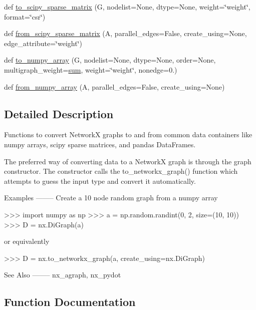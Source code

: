 \begin{DoxyCompactItemize}
def \hyperlink{namespacenetworkx_1_1convert__matrix_a47cedef23442ab34bf69fffb4119a442}{to\+\_\+scipy\+\_\+sparse\+\_\+matrix} (G, nodelist=None, dtype=None, weight=\char`\"{}weight\char`\"{}, format=\char`\"{}csr\char`\"{})
\item 
def \hyperlink{namespacenetworkx_1_1convert__matrix_ac8fbd2e587cd297b41557ad1299a9e7d}{from\+\_\+scipy\+\_\+sparse\+\_\+matrix} (A, parallel\+\_\+edges=False, create\+\_\+using=None, edge\+\_\+attribute=\char`\"{}weight\char`\"{})
\item 
def \hyperlink{namespacenetworkx_1_1convert__matrix_acff6b353b4693143c1fad4d2c1c7a335}{to\+\_\+numpy\+\_\+array} (G, nodelist=None, dtype=None, order=None, multigraph\+\_\+weight=\hyperlink{assumed__shape_2foo__free_8f90_a1c860bb40bf43c289bc16f8634733f9a}{sum}, weight=\char`\"{}weight\char`\"{}, nonedge=0.)
\item 
def \hyperlink{namespacenetworkx_1_1convert__matrix_abb1bfd74c48ba52319e8ccbaa20b964a}{from\+\_\+numpy\+\_\+array} (A, parallel\+\_\+edges=False, create\+\_\+using=None)
\end{DoxyCompactItemize}


\subsection{Detailed Description}
\begin{DoxyVerb}Functions to convert NetworkX graphs to and from common data containers
like numpy arrays, scipy sparse matrices, and pandas DataFrames.

The preferred way of converting data to a NetworkX graph is through the
graph constructor.  The constructor calls the to_networkx_graph() function
which attempts to guess the input type and convert it automatically.

Examples
--------
Create a 10 node random graph from a numpy array

>>> import numpy as np
>>> a = np.random.randint(0, 2, size=(10, 10))
>>> D = nx.DiGraph(a)

or equivalently

>>> D = nx.to_networkx_graph(a, create_using=nx.DiGraph)

See Also
--------
nx_agraph, nx_pydot
\end{DoxyVerb}
 

\subsection{Function Documentation}
\mbox{\label{namespacenetworkx_1_1convert__matrix_abb1bfd74c48ba52319e8ccbaa20b964a}} 
